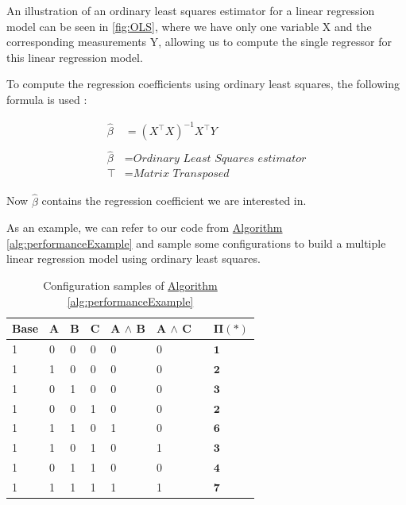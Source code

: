 An illustration of an ordinary least squares estimator for a linear regression model can be seen in \autoref{fig:OLS}, where we have only one variable 
X and the corresponding measurements Y, allowing us to compute the single regressor for this linear regression model.

To compute the regression coefficients using ordinary least squares, the following formula is used \cite{Linear-Regression}:

\begin{align}
    \hat{\beta} &=  (\textit{X}^{\top } \textit{X} )^{-1}\textit{X}^{\top} Y \\ \nonumber \\\nonumber
    \hat{\beta} &= \textit{Ordinary Least Squares estimator}\\\nonumber
    \top &= \textit{Matrix Transposed}\nonumber
\end{align}\label{equ:ols}

Now $\hat{\beta}$ contains the regression coefficient we are interested in.

As an example, we can refer to our code from \hyperref[alg:performanceExample]{Algorithm \ref*{alg:performanceExample}}
and sample some configurations to build a multiple linear regression model using ordinary least squares.

\begin{table}[H]
    \centering
    \begin{tabular}{llllllll}
    \hline
    Base & A & B & C & A $\land$ B & A $\land$ C &  & $\bm{\Pi(*)}$ \\ \hline
    1    & 0 & 0 & 0 & 0           & 0           &  &  $\mathbf{1}$   \\
    1    & 1 & 0 & 0 & 0           & 0           &  &  $\mathbf{2}$   \\
    1    & 0 & 1 & 0 & 0           & 0           &  &   $\mathbf{3}$  \\  
    1    & 0 & 0 & 1 & 0           & 0           &  &   $\mathbf{2}$  \\  
    1    & 1 & 1 & 0 & 1           & 0           &  &   $\mathbf{6}$   \\
    1    & 1 & 0 & 1 & 0           & 1           &  &   $\mathbf{3}$  \\  
    1    & 0 & 1 & 1 & 0           & 0           &  &   $\mathbf{4}$  \\  
    1    & 1 & 1 & 1 & 1           & 1           &  &   $\mathbf{7}$  \\ \hline

    \end{tabular}  
    \caption{Configuration samples of \hyperref[alg:performanceExample]{Algorithm \ref*{alg:performanceExample}}}\label{tab:alternative}
\end{table}


